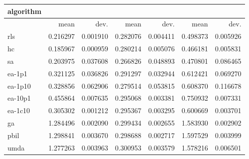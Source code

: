 \begin{tabular}{@{}l*{6}{>{{}}N{1}{2}}@{}}
\toprule
{algorithm} &  &  &  \\
\midrule
& {mean} & {dev.} & {mean} & {dev.} & {mean} & {dev.} \\
\midrule
rls & 0.216297 & 0.001910 & 0.282076 & 0.004411 & 0.498373 & 0.005926 \\
 hc & 0.185967 & 0.000959 & 0.280214 & 0.005076 & 0.466181 & 0.005831 \\
 sa & 0.203975 & 0.037608 & 0.266826 & 0.048893 & 0.470801 & 0.086465 \\
 ea-1p1 & 0.321125 & 0.036826 & 0.291297 & 0.032944 & 0.612421 & 0.069270 \\
 ea-1p10 & 0.328856 & 0.062906 & 0.279514 & 0.053815 & 0.608370 & 0.116678 \\
 ea-10p1 & 0.455864 & 0.007635 & 0.295068 & 0.003381 & 0.750932 & 0.007331 \\
 ea-1c10 & 0.305302 & 0.001212 & 0.295367 & 0.003295 & 0.600669 & 0.003701 \\
 ga & 1.284496 & 0.002090 & 0.299434 & 0.002655 & 1.583930 & 0.002902 \\
 pbil & 1.298841 & 0.003670 & 0.298688 & 0.002717 & 1.597529 & 0.003999 \\
 umda & 1.277263 & 0.003963 & 0.300953 & 0.003579 & 1.578216 & 0.006501 \\
 \bottomrule
\end{tabular}
